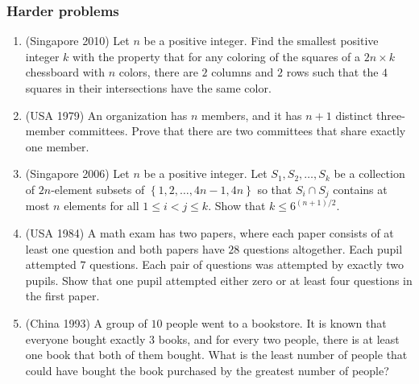 \documentclass[11pt,paper=letter]{scrartcl}
\begin{document}
\subsubsection*{Harder problems}

\begin{enumerate}[resume]

\item (Singapore 2010) Let $n$ be a positive integer. Find the smallest positive integer $k$ with the property that for any coloring of the squares of a $2n \times k$ chessboard with $n$ colors, there are $2$ columns and $2$ rows such that the $4$ squares in their intersections have the same color. \hint{\ref{h:4}}

\item (USA 1979) An organization has $n$ members, and it has $n + 1$ distinct three-member committees. Prove that there are two committees that share exactly one member. \hint{\ref{h:5}}

\item (Singapore 2006) Let $n$ be a positive integer. Let $S_1, S_2, \ldots, S_k$ be a collection of $2n$-element subsets of $ \left\{ 1, 2, \ldots, 4n -1, 4n \right\} $ so that $S_i \cap S_j$ contains at most $n$ elements for all $1 \le i < j \le k$. Show that $k \le 6^{(n+1)/2} $. \hint{\ref{h:6}}

\item (USA 1984) A math exam has two papers, where each paper consists of at least one question and both papers have $28$ questions altogether. Each pupil attempted $7$ questions. Each pair of questions was attempted by exactly two pupils. Show that one pupil attempted either zero or at least four questions in the first paper. \hint{\ref{h:7}}

\item (China 1993) A group of $10$ people went to a bookstore. It is known that everyone bought exactly $3$ books, and for every two people, there is at least one book that both of them bought. What is the least number of people that could have bought the book purchased by the greatest number of people? \hint{\ref{h:8}}



\end{enumerate}
\end{document}
